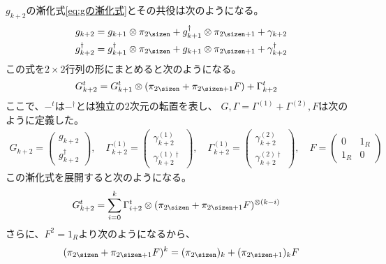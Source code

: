 	$g_{k+2}$の漸化式\eqref{eq:gの漸化式}とその共役は次のようになる。
	\begin{equation*}\begin{split} %
		g_{k+2} &= g_{k+1}\otimes \pi_\myeven 
			+ g_{k+1}^\dag\otimes \pi_\myodd + \gamma_{k+2} \\
		g_{k+2}^\dag &= g_{k+1}^\dag\otimes \pi_\myeven 
			+ g_{k+1}\otimes \pi_\myodd + \gamma_{k+2}^\dag \\
	\end{split}\end{equation*} %
	この式を$2\times 2$行列の形にまとめると次のようになる。
	\begin{equation}\label{eq:gの漸化式の行列版}\begin{split} %
		G_{k+2}^t &= G_{k+1}^t\otimes(\pi_\myeven + \pi_\myodd F) 
			+ \Gamma_{k+2}^t
	\end{split}\end{equation} %
	ここで、$-^t$は$-^\dag$とは独立の$2$次元の転置を表し、
	$G,\Gamma=\Gamma^{(1)}+\Gamma^{(2)},F$は次のように定義した。
	\begin{equation}\label{eq:Gammaの定義}\begin{split} %
		G_{k+2} = \begin{pmatrix}
			g_{k+2}\\ g_{k+2}^\dag
		\end{pmatrix},\quad \Gamma_{k+2}^{(1)} = \begin{pmatrix}
			\gamma_{k+2}^{(1)}\\ \gamma_{k+2}^{(1)\dag}
		\end{pmatrix},\quad \Gamma_{k+2}^{(1)} = \begin{pmatrix}
			\gamma_{k+2}^{(2)}\\ \gamma_{k+2}^{(2)\dag}
		\end{pmatrix},\quad F = \begin{pmatrix}
			0 & 1_R \\ 1_R & 0
		\end{pmatrix}
	\end{split}\end{equation} %
	この漸化式を展開すると次のようになる。
	\begin{equation*}\begin{split} %
		G_{k+2}^t &= \sum_{i=0}^{k}
			\Gamma_{i+2}^t\otimes(\pi_\myeven + \pi_\myodd F)^{\otimes(k-i)}
	\end{split}\end{equation*} %
	さらに、$F^2=1_R$より次のようになるから、
	\begin{equation*}\begin{split} %
		(\pi_\myeven + \pi_\myodd F)^k = (\pi_\myeven)_k + (\pi_\myodd)_k F
	\end{split}\end{equation*} %
